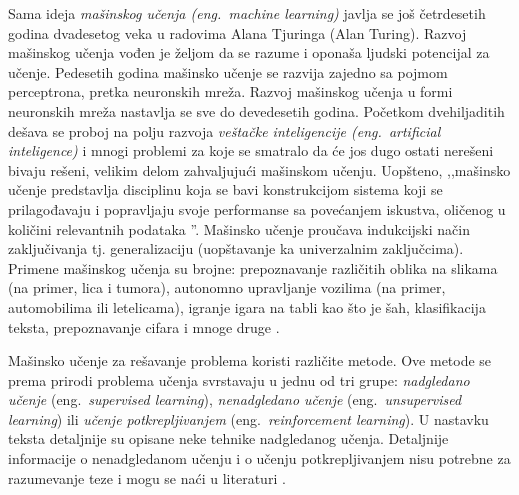 \documentclass[12pt,oneside]{memoir}
\begin{document}
Sama ideja \textit{mašinskog učenja (eng.~machine learning)} javlja se još četrdesetih godina dvadesetog veka u radovima Alana Tjuringa (Alan Turing). Razvoj mašinskog učenja vođen je željom da se razume i oponaša ljudski potencijal za učenje. Pedesetih godina mašinsko učenje se razvija zajedno sa pojmom perceptrona, pretka neuronskih mreža. Razvoj mašinskog učenja u formi neuronskih mreža nastavlja se sve do devedesetih godina. Početkom dvehiljaditih dešava se proboj na polju razvoja \textit{veštačke inteligencije (eng.~artificial inteligence)} i mnogi problemi za koje se smatralo da će jos dugo ostati nerešeni bivaju rešeni, velikim delom zahvaljujući mašinskom učenju. Uopšteno, ,,mašinsko učenje predstavlja disciplinu koja se bavi konstrukcijom sistema koji se prilagođavaju i popravljaju svoje performanse sa povećanjem iskustva, oličenog u količini relevantnih podataka \cite{mladen}''. Mašinsko učenje proučava indukcijski način zaključivanja tj. generalizaciju (uopštavanje ka univerzalnim zaključcima). Primene mašinskog učenja su brojne: prepoznavanje različitih oblika na slikama (na primer, lica i tumora), autonomno upravljanje vozilima (na primer, automobilima ili letelicama), igranje igara na tabli kao što je šah, klasifikacija teksta, prepoznavanje cifara i mnoge druge \cite{mladen}.

Mašinsko učenje za rešavanje problema koristi različite metode. Ove metode se prema prirodi problema učenja svrstavaju u jednu od tri grupe: \textit{nadgledano učenje} (eng.~\textit{supervised learning}), \textit{nenadgledano učenje} (eng.~\textit{unsupervised learning}) ili \textit{učenje potkrepljivanjem} (eng.~\textit{reinforcement learning}). U nastavku teksta detaljnije su opisane neke tehnike nadgledanog učenja. Detaljnije informacije o nenadgledanom učenju i o učenju potkrepljivanjem nisu potrebne za razumevanje teze i mogu se naći u literaturi \cite{mlm, reinforcement-learning, mladen}.
\end{document}
